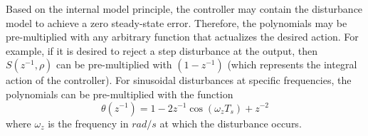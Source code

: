 \documentclass[journal]{IEEEtran}
\begin{document}
Based on the internal model principle, the controller may contain the disturbance model to achieve a zero steady-state error. Therefore, the polynomials may be pre-multiplied with any arbitrary function that actualizes the desired action. For example, if it is desired to reject a step disturbance at the output, then $S(z^{-1},\rho)$ can be pre-multiplied with $(1-z^{-1})$ (which represents the integral action of the controller). For sinusoidal disturbances at specific frequencies, the polynomials can be pre-multiplied with the function
\begin{equation*}
\theta (z^{-1}) = 1-2z^{-1} \cos(\omega_z T_s) + z^{-2}
\end{equation*}  
where $\omega_z$ is the frequency in $rad/s$ at which the disturbance occurs. %
\end{document}
